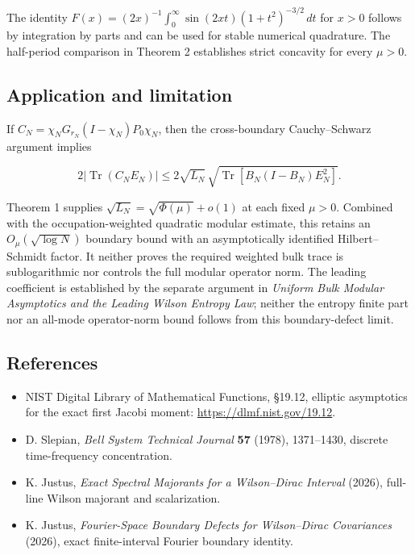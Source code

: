 \documentclass[
  10pt,
  a4paper,
]{article}
\providecommand{\tightlist}{%
  \setlength{\itemsep}{0pt}\setlength{\parskip}{0pt}}
\begin{document}
The identity \(F(x)=(2x)^{-1}\int_0^\infty\sin(2xt)(1+t^2)^{-3/2}\,dt\) for \(x>0\) follows by integration by parts and can be used for stable numerical quadrature. The half-period comparison in Theorem 2 establishes strict concavity for every \(\mu>0\).

\subsection{Application and limitation}\label{application-and-limitation}

If \(C_N=\chi_N G_{r_N}(I-\chi_N)P_0\chi_N\), then the cross-boundary Cauchy--Schwarz argument implies

\[
2|\operatorname{Tr}(C_NE_N)|
\le 2\sqrt{L_N}\,\sqrt{\operatorname{Tr}[B_N(I-B_N)E_N^2]}.
\]

Theorem 1 supplies \(\sqrt{L_N}=\sqrt{\Phi(\mu)}+o(1)\) at each fixed \(\mu>0\). Combined with the occupation-weighted quadratic modular estimate, this retains an \(O_\mu(\sqrt{\log N})\) boundary bound with an asymptotically identified Hilbert--Schmidt factor. It neither proves the required weighted bulk trace is sublogarithmic nor controls the full modular operator norm. The leading coefficient is established by the separate argument in \emph{Uniform Bulk Modular Asymptotics and the Leading Wilson Entropy Law}; neither the entropy finite part nor an all-mode operator-norm bound follows from this boundary-defect limit.

\subsection{References}\label{references}

\begin{itemize}
\tightlist
\item
  NIST Digital Library of Mathematical Functions, §19.12, elliptic asymptotics for the exact first Jacobi moment: \url{https://dlmf.nist.gov/19.12}.
\item
  D. Slepian, \emph{Bell System Technical Journal} \textbf{57} (1978), 1371--1430, discrete time-frequency concentration.
\item
  K. Justus, \emph{Exact Spectral Majorants for a Wilson--Dirac Interval} (2026), full-line Wilson majorant and scalarization.
\item
  K. Justus, \emph{Fourier-Space Boundary Defects for Wilson--Dirac Covariances} (2026), exact finite-interval Fourier boundary identity.
\end{itemize}
\end{document}
